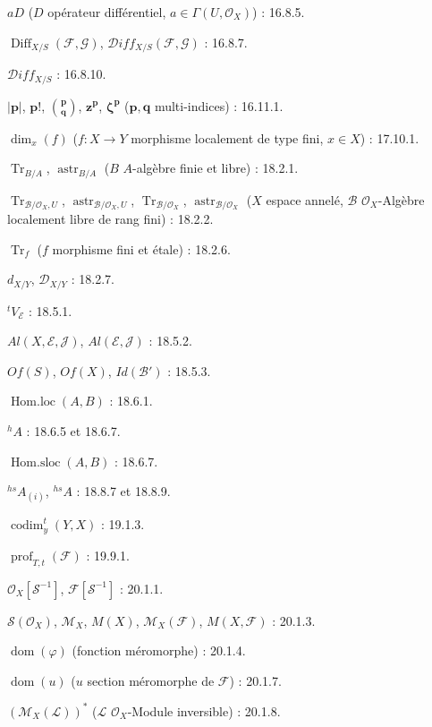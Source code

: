 $aD$ ($D$ opérateur différentiel, $a\in\Gamma(U,\mathcal{O}_X)$) : 16.8.5.

$\operatorname{Diff}_{X/S}(\mathcal{F},\mathcal{G})$,
$\mathcal{D}iff_{X/S}(\mathcal{F},\mathcal{G})$ : 16.8.7.

$\mathcal{D}iff_{X/S}$ : 16.8.10.

$|\mathbf p|$, $\mathbf p!$, $\binom{\mathbf p}{\mathbf q}$,
$\mathbf z^{\mathbf p}$, $\boldsymbol\zeta^{\mathbf p}$
($\mathbf p,\mathbf q$ multi-indices) : 16.11.1.

$\dim_x(f)$ ($f:X\to Y$ morphisme localement de type fini, $x\in X$) : 17.10.1.

$\operatorname{Tr}_{B/A}$, $\operatorname{astr}_{B/A}$
($B$ $A$-algèbre finie et libre) : 18.2.1.

$\operatorname{Tr}_{\mathcal B/\mathcal O_X,U}$,
$\operatorname{astr}_{\mathcal B/\mathcal O_X,U}$,
$\operatorname{Tr}_{\mathcal B/\mathcal O_X}$,
$\operatorname{astr}_{\mathcal B/\mathcal O_X}$
($X$ espace annelé, $\mathcal B$ $\mathcal O_X$-Algèbre localement libre de rang fini) : 18.2.2.

$\operatorname{Tr}_f$ ($f$ morphisme fini et étale) : 18.2.6.

$d_{X/Y}$, $\mathcal D_{X/Y}$ : 18.2.7.

${}^{t}V_{\mathcal E}$ : 18.5.1.

$Al(X,\mathcal E,\mathcal J)$, $Al(\mathcal E,\mathcal J)$ : 18.5.2.

$Of(S)$, $Of(X)$, $Id(\mathcal B')$ : 18.5.3.

$\operatorname{Hom.loc}(A,B)$ : 18.6.1.

${}^{h}A$ : 18.6.5 et 18.6.7.

$\operatorname{Hom.sloc}(A,B)$ : 18.6.7.

${}^{hs}A_{(i)}$, ${}^{hs}A$ : 18.8.7 et 18.8.9.

$\operatorname{codim}^{t}_{y}(Y,X)$ : 19.1.3.

$\operatorname{prof}_{T,t}(\mathcal F)$ : 19.9.1.

$\mathcal O_X[\mathcal S^{-1}]$, $\mathcal F[\mathcal S^{-1}]$ : 20.1.1.

$\mathcal S(\mathcal O_X)$, $\mathcal M_X$, $M(X)$,
$\mathcal M_X(\mathcal F)$, $M(X,\mathcal F)$ : 20.1.3.

$\operatorname{dom}(\varphi)$ (fonction méromorphe) : 20.1.4.

$\operatorname{dom}(u)$ ($u$ section méromorphe de $\mathcal F$) : 20.1.7.

$(\mathcal M_X(\mathcal L))^{*}$
($\mathcal L$ $\mathcal O_X$-Module inversible) : 20.1.8.

